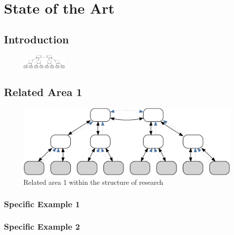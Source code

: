 \cleardoublepage\chapter{State of the Art}\label{sec:sota}\minitoc\vspace{.5cm}

\section{Introduction}

\begin{figure}
    \centering
    \includegraphics[width=0.2\textwidth]{resources/images/example3}
\end{figure}


\section{Related Area 1}

\begin{figure}[H]
    \centering
    \includegraphics[width=.55\textwidth]{resources/images/example3}
    \caption{Related area 1 within the structure of research}\label{fig:hourglass:ra1}
\end{figure}



\subsection{Specific Example 1}



\subsection{Specific Example 2}

